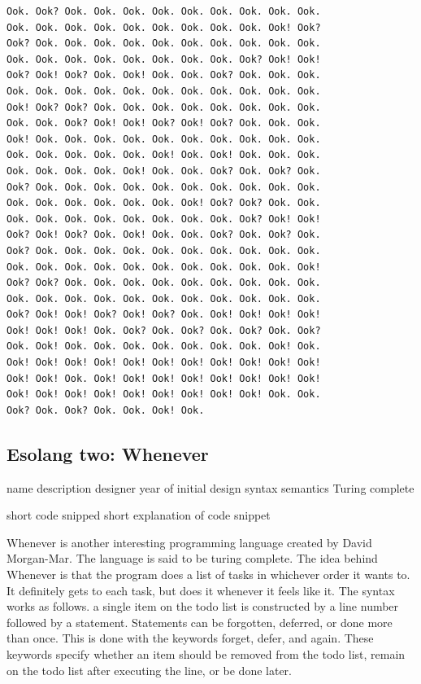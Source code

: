 \documentclass[a4paper]{article}
\begin{document}
	\begin{lstlisting}
Ook. Ook? Ook. Ook. Ook. Ook. Ook. Ook. Ook. Ook. Ook. 
Ook. Ook. Ook. Ook. Ook. Ook. Ook. Ook. Ook. Ook! Ook?
Ook? Ook. Ook. Ook. Ook. Ook. Ook. Ook. Ook. Ook. Ook. 
Ook. Ook. Ook. Ook. Ook. Ook. Ook. Ook. Ook? Ook! Ook! 
Ook? Ook! Ook? Ook. Ook! Ook. Ook. Ook? Ook. Ook. Ook. 
Ook. Ook. Ook. Ook. Ook. Ook. Ook. Ook. Ook. Ook. Ook. 
Ook! Ook? Ook? Ook. Ook. Ook. Ook. Ook. Ook. Ook. Ook. 
Ook. Ook. Ook? Ook! Ook! Ook? Ook! Ook? Ook. Ook. Ook. 
Ook! Ook. Ook. Ook. Ook. Ook. Ook. Ook. Ook. Ook. Ook. 
Ook. Ook. Ook. Ook. Ook. Ook! Ook. Ook! Ook. Ook. Ook. 
Ook. Ook. Ook. Ook. Ook! Ook. Ook. Ook? Ook. Ook? Ook. 
Ook? Ook. Ook. Ook. Ook. Ook. Ook. Ook. Ook. Ook. Ook. 
Ook. Ook. Ook. Ook. Ook. Ook. Ook! Ook? Ook? Ook. Ook. 
Ook. Ook. Ook. Ook. Ook. Ook. Ook. Ook. Ook? Ook! Ook! 
Ook? Ook! Ook? Ook. Ook! Ook. Ook. Ook? Ook. Ook? Ook. 
Ook? Ook. Ook. Ook. Ook. Ook. Ook. Ook. Ook. Ook. Ook.
Ook. Ook. Ook. Ook. Ook. Ook. Ook. Ook. Ook. Ook. Ook! 
Ook? Ook? Ook. Ook. Ook. Ook. Ook. Ook. Ook. Ook. Ook. 
Ook. Ook. Ook. Ook. Ook. Ook. Ook. Ook. Ook. Ook. Ook. 
Ook? Ook! Ook! Ook? Ook! Ook? Ook. Ook! Ook! Ook! Ook! 
Ook! Ook! Ook! Ook. Ook? Ook. Ook? Ook. Ook? Ook. Ook? 
Ook. Ook! Ook. Ook. Ook. Ook. Ook. Ook. Ook. Ook! Ook. 
Ook! Ook! Ook! Ook! Ook! Ook! Ook! Ook! Ook! Ook! Ook! 
Ook! Ook! Ook. Ook! Ook! Ook! Ook! Ook! Ook! Ook! Ook! 
Ook! Ook! Ook! Ook! Ook! Ook! Ook! Ook! Ook! Ook. Ook. 
Ook? Ook. Ook? Ook. Ook. Ook! Ook. 
	\end{lstlisting}
	\subsection{Esolang two: Whenever}
	name
	description
		designer
		year of initial design
		syntax
		semantics
		Turing complete
		
	short code snipped
	short explanation of code snippet
	
	Whenever is another interesting programming language created by David Morgan-Mar. The language is said to be turing complete. The idea behind Whenever is that the program does a list of tasks in whichever order it wants to. It definitely gets to each task, but does it whenever it feels like it. The syntax works as follows. a single item on the todo list is constructed by a line number followed by a statement. Statements can be forgotten, deferred, or done more than once. This is done with the keywords forget, defer, and again. These keywords specify whether an item should be removed from the todo list, remain on the todo list after executing the line, or be done later.
	
\end{document}
